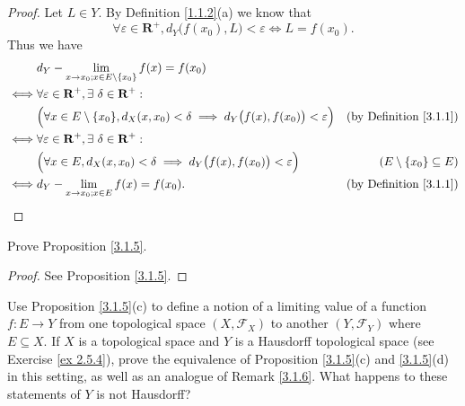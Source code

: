 \begin{proof}
    Let \(L \in Y\).
    By Definition \ref{1.1.2}(a) we know that
    \[
        \forall \varepsilon \in \mathbf{R}^+, d_Y\big(f(x_0), L\big) < \varepsilon \iff L = f(x_0).
    \]
    Thus we have
    \begin{align*}
             & d_Y - \lim_{x \to x_0 ; x \in E \setminus \{x_0\}} f(x) = f(x_0)                                                                                        \\
        \iff & \forall \varepsilon \in \mathbf{R}^+, \exists\ \delta \in \mathbf{R}^+ :                                                                                \\
             & \Big(\forall x \in E \setminus \{x_0\}, d_X(x, x_0) < \delta \implies d_Y\big(f(x), f(x_0)\big) < \varepsilon\Big) & \text{(by Definition \ref{3.1.1})} \\
        \iff & \forall \varepsilon \in \mathbf{R}^+, \exists\ \delta \in \mathbf{R}^+ :                                                                                \\
             & \Big(\forall x \in E, d_X(x, x_0) < \delta \implies d_Y\big(f(x), f(x_0)\big) < \varepsilon\Big)                   & (E \setminus \{x_0\} \subseteq E)  \\
        \iff & d_Y - \lim_{x \to x_0 ; x \in E} f(x) = f(x_0).                                                                    & \text{(by Definition \ref{3.1.1})}
    \end{align*}
\end{proof}

\begin{exercise}\label{ex 3.1.2}
    Prove Proposition \ref{3.1.5}.
\end{exercise}

\begin{proof}
    See Proposition \ref{3.1.5}.
\end{proof}

\begin{exercise}\label{ex 3.1.3}
    Use Proposition \ref{3.1.5}(c) to define a notion of a limiting value of a function \(f : E \to Y\) from one topological space \((X, \mathcal{F}_X)\) to another \((Y, \mathcal{F}_Y)\) where \(E \subseteq X\).
    If \(X\) is a topological space and \(Y\) is a Hausdorff topological space (see Exercise \ref{ex 2.5.4}), prove the equivalence of Proposition \ref{3.1.5}(c) and \ref{3.1.5}(d) in this setting, as well as an analogue of Remark \ref{3.1.6}.
    What happens to these statements of \(Y\) is not Hausdorff?
\end{exercise}

